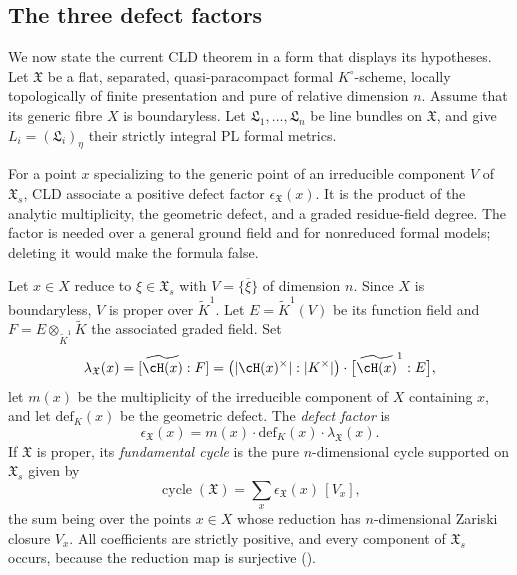 \subsection{The three defect factors}
\label{sec:ch17-defects}

We now state the current CLD theorem in a form that displays its
hypotheses.  Let $\mathfrak X$ be a flat, separated, quasi-paracompact
formal $K^\circ$-scheme,
locally topologically of finite presentation and pure of relative dimension
$n$.  Assume that its generic fibre $X$ is boundaryless.  Let
$\mathfrak L_1,\ldots,\mathfrak L_n$ be line bundles on
$\mathfrak X$, and give $L_i=(\mathfrak L_i)_\eta$ their strictly
integral PL formal metrics.

For a point $x$ specializing to the generic point of an irreducible
component $V$ of $\mathfrak X_s$, CLD associate a positive defect
factor $\epsilon_{\mathfrak X}(x)$.  It is the product of the analytic
multiplicity, the geometric defect, and a graded residue-field degree.  The
factor is needed over a general ground field and for nonreduced formal
models; deleting it would make the formula false.

\begin{definition}
\label{def:ch17-defect}
Let $x\in X$ reduce to $\xi\in\mathfrak X_s$ with
$V=\overline{\{\xi\}}$ of dimension $n$.  Since $X$ is boundaryless,
$V$ is proper over $\widetilde K^1$.  Let $E=\widetilde K^1(V)$ be its
function field and $F=E\otimes_{\widetilde K^1}\widetilde K$ the
associated graded field.  Set
\[
 \lambda_{\mathfrak X}(x)=[\widetilde{\cH(x)}:F]
 =\bigl(|\cH(x)^\times|:|K^\times|\bigr)\cdot
   \bigl[\widetilde{\cH(x)}^1:E\bigr],
\]
let $m(x)$ be the multiplicity of the irreducible component of $X$
containing $x$, and let $\mathrm{def}_K(x)$ be the geometric defect.
The \emph{defect factor} is
\[
 \epsilon_{\mathfrak X}(x)
 =m(x)\cdot\mathrm{def}_K(x)\cdot\lambda_{\mathfrak X}(x).
\]
If $\mathfrak X$ is proper, its \emph{fundamental cycle} is the pure
$n$-dimensional cycle supported on $\mathfrak X_s$ given by
\[
 \operatorname{cycle}(\mathfrak X)
 =\sum_x\epsilon_{\mathfrak X}(x)\,[V_x],
\]
the sum being over the points $x\in X$ whose reduction has
$n$-dimensional Zariski closure $V_x$.  All coefficients are strictly
positive, and every component of $\mathfrak X_s$ occurs, because the
reduction map is surjective ().
\end{definition}

